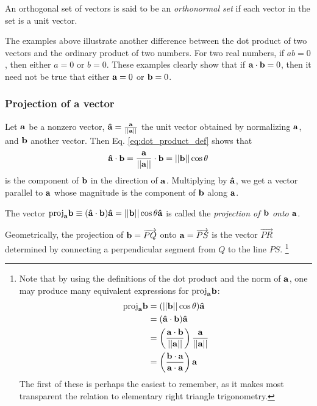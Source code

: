 \documentclass[12pt,letterpaper,reqno]{article}
\numberwithin{equation}{section}
\newcommand{\ti}[1]{\textit{#1}}
\begin{document}
\begin{defn}
	An orthogonal set of vectors is said to be an \emph{orthonormal set} if each vector in the set is a unit vector.
\end{defn}


The examples above illustrate another difference between the dot product of two vectors and the ordinary product of two numbers. For two real numbers, if $ab=0$, then either $a=0$ or $b=0$. These examples clearly show that if ${\bf a}\cdot {\bf b}=0$, then it need not be true that either ${\bf a}=0$ or ${\bf b}=0$.
\subsubsection{Projection of a vector}
Let ${\bf a}$ be a nonzero vector, ${\bf \hat{a}}=\frac{{\bf a}}{||{\bf a}||}$ the unit vector obtained by normalizing ${\bf a}$, and ${\bf b}$ another vector. Then Eq. \eqref{eq:dot_product_def} shows that
\begin{align*}
	{\bf \hat{a}}\cdot {\bf b}=\frac{{\bf a}}{||{\bf a}||} \cdot {\bf b}=||{\bf b}||\cos \theta
\end{align*} 
is the component of ${\bf b}$ in the direction of ${\bf a}$. Multiplying by ${\bf \hat{a}}$, we get a vector parallel to ${\bf a}$ whose magnitude is the component of ${\bf b}$ along ${\bf a}$.

\begin{defn}
	The vector $\text{proj}_{\bf a}{\bf b}\equiv ({\bf \hat{a}}\cdot {\bf b}){\bf \hat{a}}=||{\bf b}||\cos \theta {\bf \hat{a}}$ is called the \ti{projection of ${\bf b}$ onto ${\bf a}$}.
\end{defn}
Geometrically, the projection of ${\bf b}=\overrightarrow{PQ}$ onto ${\bf a}=\overrightarrow{PS}$ is the vector $\overrightarrow{PR}$ determined by connecting a perpendicular segment from $Q$ to the line $PS$. \footnote{Note that by using the definitions of the dot product and the norm of ${\bf a}$, one may produce many equivalent expressions for $\text{proj}_{\bf a}{\bf b}$:
\begin{align*}
	\text{proj}_{\bf a}{\bf b}&=(||{\bf b}||\cos \theta){\bf \hat{a}} \\
	&=({\bf \hat{a}}\cdot {\bf b}){\bf \hat{a}} \\
	&=\left(\frac{{\bf a}\cdot {\bf b}}{||{\bf a}||}\right)\frac{{\bf a}}{||{\bf a}||} \\
	&=\left(\frac{{\bf b}\cdot {\bf a}}{{\bf a}\cdot {\bf a}}\right){\bf a}
\end{align*}
The first of these is perhaps the easiest to remember, as it makes most transparent the relation to elementary right triangle trigonometry.}
\end{document}

